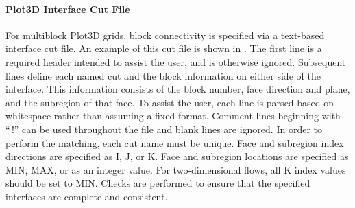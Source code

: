 \paragraph{Plot3D Interface Cut File}


For multiblock Plot3D grids, block connectivity is specified via a
text-based interface cut file.
%
An example of this cut file is shown in .
%
The first line is a required header intended to assist the user,
and is otherwise ignored.
%
Subsequent lines define each named cut and the block information on
either side of the interface.
%
This information consists of the block number, face direction and plane,
and the subregion of that face.
%
To assist the user, each line is parsed based on whitespace rather than
assuming a fixed format.  
%
Comment lines beginning with ``\,!'' can be used throughout the file
and blank lines are ignored.
%
In order to perform the matching, each cut name must be unique.
%
Face and subregion index directions are specified as I, J, or K.
%
Face and subregion locations are specified as MIN, MAX, or as an
integer value.  
%
For two-dimensional flows, all K index values should be set to MIN.
%
Checks are performed to ensure that the specified interfaces are
complete and consistent.


\vspace{1.0em}%


